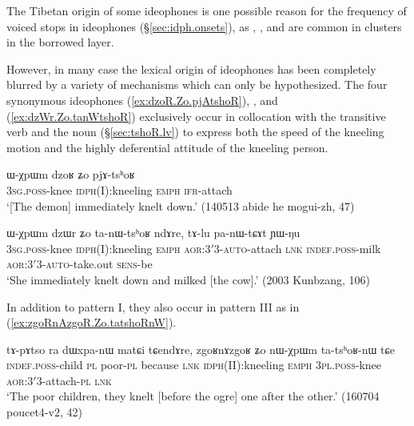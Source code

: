 The Tibetan origin of some ideophones is one possible reason for the frequency of voiced stops in ideophones (§\ref{sec:idph.onsets}), as , ,  and  are common in clusters in the borrowed layer.

However, in many case the lexical origin of ideophones has been completely blurred by a variety of mechanisms which can only be hypothesized. The four synonymous ideophones  (\ref{ex:dzoR.Zo.pjAtshoR}), ,  and  (\ref{ex:dzWr.Zo.tanWtshoR}) exclusively occur in collocation with the transitive verb  and the noun  (§\ref{sec:tshoR.lv}) to express both the speed of the kneeling motion and the highly deferential attitude of the kneeling person.  

\begin{exe}
\ex \label{ex:dzoR.Zo.pjAtshoR}
\gll ɯ-χpɯm dzoʁ ʑo pjɤ-tsʰoʁ \\
\textsc{3sg}.\textsc{poss}-knee \textsc{idph}(I):kneeling \textsc{emph} \textsc{ifr}-attach \\
\glt `[The demon] immediately knelt down.' (140513 abide he mogui-zh, 47)
\end{exe}

\begin{exe}
\ex \label{ex:dzWr.Zo.tanWtshoR}
\gll ɯ-χpɯm dzɯr ʑo ta-nɯ-tsʰoʁ ndɤre, tɤ-lu pa-nɯ-tɕɤt ɲɯ-ŋu \\
 \textsc{3sg}.\textsc{poss}-knee \textsc{idph}(I):kneeling \textsc{emph} \textsc{aor}:3$'$\fl{}3-\textsc{auto}-attach \textsc{lnk} \textsc{indef}.\textsc{poss}-milk \textsc{aor}:3$'$\fl{}3-\textsc{auto}-take.out \textsc{sens}-be \\
 \glt `She immediately knelt down and milked [the cow].' (2003 Kunbzang, 106)
\end{exe}

In addition to pattern I, they also occur in pattern III as in (\ref{ex:zgoRnAzgoR.Zo.tatshoRnW}).

\begin{exe}
\ex \label{ex:zgoRnAzgoR.Zo.tatshoRnW}
\gll  tɤ-pɤtso ra dɯxpa-nɯ matɕi tɕendɤre, zgoʁnɤzgoʁ ʑo nɯ-χpɯm ta-tsʰoʁ-nɯ tɕe \\
\textsc{indef}.\textsc{poss}-child \textsc{pl} poor-\textsc{pl} because \textsc{lnk} \textsc{idph}(II):kneeling \textsc{emph}  \textsc{3pl}.\textsc{poss}-knee \textsc{aor}:3$'$\fl{}3-attach-\textsc{pl} \textsc{lnk} \\
\glt `The poor children, they knelt [before the ogre] one after the other.' (160704 poucet4-v2, 42)
\end{exe}

